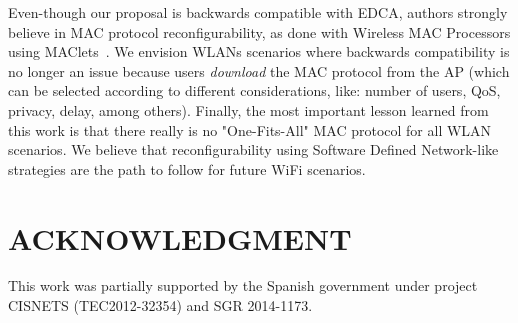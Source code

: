\documentclass[a4paper]{article}
\begin{document}
Even-though our proposal is backwards compatible with EDCA, authors strongly believe in MAC protocol reconfigurability, as done with Wireless MAC Processors using MAClets~\cite{WMP, bianchi2012maclets}. We envision WLANs scenarios where backwards compatibility is no longer an issue because users \emph{download} the MAC protocol from the AP (which can be selected according to different considerations, like: number of users, QoS, privacy, delay, among others). Finally, the most important lesson learned from this work is that there really is no "One-Fits-All" MAC protocol for all WLAN scenarios. We believe that reconfigurability using Software Defined Network-like strategies are the path to follow for future WiFi scenarios.

\section*{ACKNOWLEDGMENT}
This work was partially supported by the Spanish government under project CISNETS (TEC2012-32354) and SGR 2014-1173.



\end{document}
